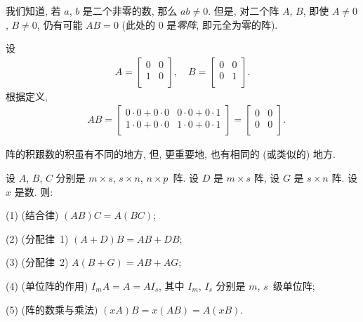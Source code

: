 我们知道, 若 \(a\), \(b\) 是二个非零的数,
那么 \(ab \neq 0\).
但是, 对二个阵 \(A\), \(B\),
即使 \(A \neq 0\), \(B \neq 0\),
仍有可能 \(AB = 0\)
(此处的 \(0\) 是\emph{零阵},
即元全为零的阵).

\begin{example}
    设
    \begin{align*}
        A = \begin{bmatrix}
                0 & 0 \\
                1 & 0 \\
            \end{bmatrix},
        \quad
        B = \begin{bmatrix}
                0 & 0 \\
                0 & 1 \\
            \end{bmatrix}.
    \end{align*}
    根据定义,
    \begin{align*}
         &
        AB = \begin{bmatrix}
                 0 \cdot 0 + 0 \cdot 0 & 0 \cdot 0 + 0 \cdot 1 \\
                 1 \cdot 0 + 0 \cdot 0 & 1 \cdot 0 + 0 \cdot 1 \\
             \end{bmatrix}
        = \begin{bmatrix}
              0 & 0 \\
              0 & 0 \\
          \end{bmatrix}.
    \end{align*}
\end{example}

阵的积跟数的积虽有不同的地方,
但, 更重要地, 也有相同的 (或类似的) 地方.

\begin{theorem}
    设 \(A\), \(B\), \(C\) 分别是
    \(m \times s\), \(s \times n\), \(n \times p\)~阵.
    设 \(D\) 是 \(m \times s\) 阵,
    设 \(G\) 是 \(s \times n\) 阵.
    设 \(x\) 是数.
    则:

    (1)
    (结合律)
    \((AB)C = A(BC)\);

    (2)
    (分配律~1)
    \((A + D) B = AB + DB\);

    (3)
    (分配律~2)
    \(A (B + G) = AB + AG\);

    (4)
    (单位阵的作用)
    \(I_m A = A = A I_s\),
    其中 \(I_m\), \(I_s\) 分别是 \(m\), \(s\)~级单位阵;

    (5)
    (阵的数乘与乘法)
    \((xA)B = x(AB) = A(xB)\).
\end{theorem}

